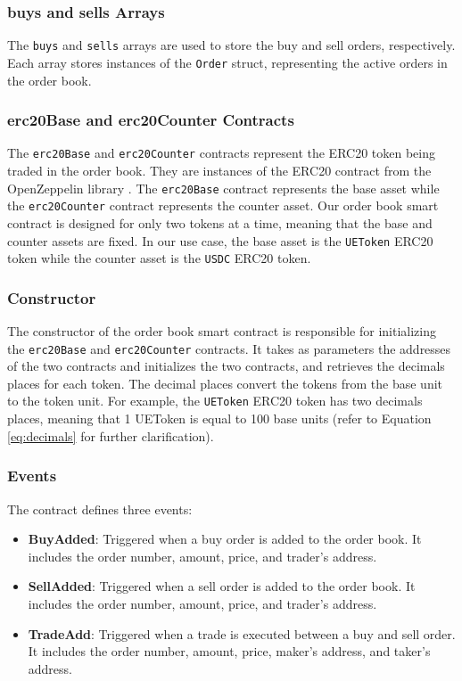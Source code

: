 \subsubsection{buys and sells Arrays}


The \texttt{buys} and \texttt{sells} arrays are used to store the buy and sell orders, respectively. Each array stores instances
of the \texttt{Order} struct, representing the active orders in the order book.


\subsubsection{erc20Base and erc20Counter Contracts}


The \texttt{erc20Base} and \texttt{erc20Counter} contracts represent the ERC20 token being traded in the order book. They are
instances of the ERC20 contract from the OpenZeppelin library \cite{openzeppelin_erc20}. The \texttt{erc20Base} contract represents
the base asset while the \texttt{erc20Counter} contract represents the counter asset. Our order book smart contract is designed
for only two tokens at a time, meaning that the base and counter assets are fixed. In our use case, the base asset is the \texttt{UEToken}
ERC20 token while the counter asset is the \texttt{USDC} ERC20 token.


\subsubsection{Constructor}


The constructor of the order book smart contract is responsible for initializing the \texttt{erc20Base} and \texttt{erc20Counter}
contracts. It takes as parameters the addresses of the two contracts and initializes the two contracts, and retrieves the decimals
places for each token. The decimal places convert the tokens from the base unit to the token unit. For example,
the \texttt{UEToken} ERC20 token has two decimals places, meaning that 1 UEToken is equal to 100 base units (refer to Equation \ref{eq:decimals}
for further clarification).

\subsubsection{Events}


The contract defines three events:


\begin{itemize}
    \item \textbf{BuyAdded}: Triggered when a buy order is added to the order book. It includes the order number, amount, price, and trader's address.
    \item \textbf{SellAdded}: Triggered when a sell order is added to the order book. It includes the order number, amount, price, and trader's address.
    \item \textbf{TradeAdd}: Triggered when a trade is executed between a buy and sell order. It includes the order number, amount, price, maker's address, and taker's address.
\end{itemize}


